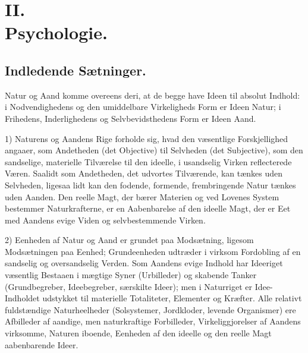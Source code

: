\documentclass[11pt]{book}
\newcommand{\opage}[1]{\marginnote{\footnotesize\textit{[#1]}}}
\begin{document}
\part*{II.\\ Psychologie.}

\opage{264} \setcounter{footnote}{0}%
\chapter*{Indledende Sætninger.}

Natur og Aand komme overeens deri, at de begge have Ideen til
absolut Indhold: i Nodvendighedens og den umiddelbare Virkeligheds
Form er Ideen Natur; i Frihedens, Inderlighedens og Selvbevidsthedens
Form er Ideen Aand.

1) Naturens og Aandens Rige forholde sig, hvad den væsentlige
Forskjellighed angaaer, som Andetheden (det Objective) til Selvheden
(det Subjective), som den sandselige, materielle Tilværelse til den
ideelle, i usandselig Virken reflecterede Væren. Saalidt som
Andetheden, det udvortes Tilværende, kan tænkes uden Selvheden,
ligesaa lidt kan den fodende, formende, frembringende Natur tænkes
uden Aanden. Den reelle Magt, der bærer Materien og ved Lovenes
System bestemmer Naturkrafterne, er en Aabenbarelse af den ideelle
Magt, der er Eet med Aandens evige Viden og selvbestemmende Virken.

2) Eenheden af Natur og Aand er grundet paa Modsætning,
ligesom Modsætningen paa Eenhed; Grundeenheden udtræder i virksom
Fordobling af en sandselig og oversandselig Verden. Som Aandens
evige Indhold har Ideeriget væsentlig Bestaaen i mægtige Syner
(Urbilleder) og skabende Tanker (Grundbegreber, Ideebegreber,
særskilte Ideer); men i Naturriget er Idee-Indholdet udstykket til
materielle Totaliteter, Elementer og Kræfter. Alle relativt
fuldstændige Naturheelheder (Solsystemer, Jordkloder, levende
Organismer) ere Afbilleder af aandige, men naturkraftige Forbilleder,
Virkeliggjorelser af Aandens virksomme, Naturen iboende, Eenheden af
den ideelle og den reelle Magt aabenbarende Ideer.
\end{document}
